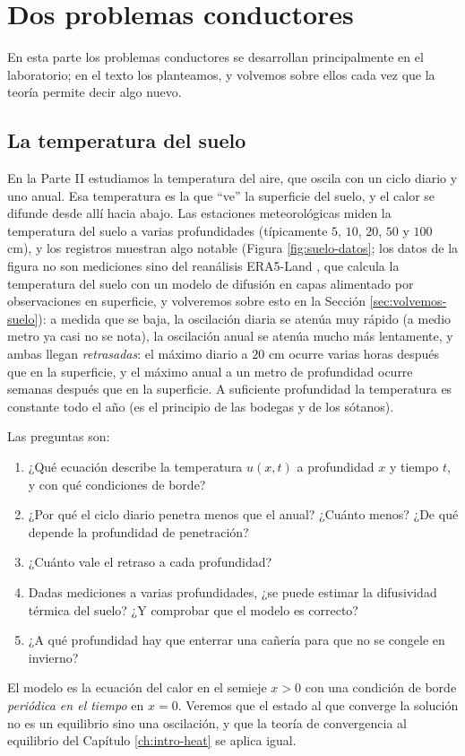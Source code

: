 \documentclass[12pt, a4paper]{amsbook}
\theoremstyle{remark}
\theoremstyle{definition}
\numberwithin{section}{chapter}
\numberwithin{subsection}{section}
\numberwithin{equation}{section}
\numberwithin{figure}{chapter}
\begin{document}
\section{Dos problemas conductores}\label{sec:conductores-III}

En esta parte los problemas conductores se desarrollan principalmente en el laboratorio; en el texto los planteamos, y volvemos sobre ellos cada vez que la teoría permite decir algo nuevo.

\subsection*{La temperatura del suelo}\label{sec:conductor-suelo}

En la Parte II estudiamos la temperatura del aire, que oscila con un ciclo diario y uno anual. Esa temperatura es la que ``ve'' la superficie del suelo, y el calor se difunde desde allí hacia abajo. Las estaciones meteorológicas miden la temperatura del suelo a varias profundidades (típicamente $5$, $10$, $20$, $50$ y $100$ cm), y los registros muestran algo notable (Figura \ref{fig:suelo-datos}; los datos de la figura no son mediciones sino del reanálisis ERA5-Land \cite{MunozSabater2021}, que calcula la temperatura del suelo con un modelo de difusión en capas alimentado por observaciones en superficie, y volveremos sobre esto en la Sección \ref{sec:volvemos-suelo}): a medida que se baja, la oscilación diaria se atenúa muy rápido (a medio metro ya casi no se nota), la oscilación anual se atenúa mucho más lentamente, y ambas llegan \emph{retrasadas}: el máximo diario a $20$ cm ocurre varias horas después que en la superficie, y el máximo anual a un metro de profundidad ocurre semanas después que en la superficie. A suficiente profundidad la temperatura es constante todo el año (es el principio de las bodegas y de los sótanos).

Las preguntas son:
\begin{enumerate}
\item ¿Qué ecuación describe la temperatura $u(x,t)$ a profundidad $x$ y tiempo $t$, y con qué condiciones de borde?
\item ¿Por qué el ciclo diario penetra menos que el anual? ¿Cuánto menos? ¿De qué depende la profundidad de penetración?
\item ¿Cuánto vale el retraso a cada profundidad?
\item Dadas mediciones a varias profundidades, ¿se puede estimar la difusividad térmica del suelo? ¿Y comprobar que el modelo es correcto?
\item ¿A qué profundidad hay que enterrar una cañería para que no se congele en invierno?
\end{enumerate}
El modelo es la ecuación del calor en el semieje $x>0$ con una condición de borde \emph{periódica en el tiempo} en $x=0$. Veremos que el estado al que converge la solución no es un equilibrio sino una oscilación, y que la teoría de convergencia al equilibrio del Capítulo \ref{ch:intro-heat} se aplica igual.
\end{document}
